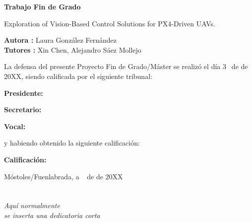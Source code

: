 \documentclass[a4paper, 12pt]{book}
\begin{document}
\vspace{-4cm}
\begin{center}
\LARGE
\textbf{Trabajo Fin de Grado}

\vspace{1cm}
\large
Exploration of Vision-Based Control Solutions for PX4-Driven UAVs.

\vspace{1cm}
\large
\textbf{Autora :} Laura González Fernández \\
\textbf{Tutores :} Xin Chen, Alejandro Sáez Mollejo

\end{center}

\vspace{1cm}
La defensa del presente Proyecto Fin de Grado/Máster se realizó el día 3\qquad$\;\,$ de
\qquad\qquad\qquad\qquad \newline de 20XX, siendo calificada por el siguiente tribunal:


\vspace{0.5cm}
\textbf{Presidente:}

\vspace{0.8cm}
\textbf{Secretario:}

\vspace{0.8cm}
\textbf{Vocal:}


\vspace{0.8cm}
y habiendo obtenido la siguiente calificación:

\vspace{0.8cm}
\textbf{Calificación:}


\vspace{0.8cm}
\begin{flushright}
Móstoles/Fuenlabrada, a \qquad$\;\,$ de \qquad\qquad\qquad\qquad de 20XX
\end{flushright}


\chapter*{}
\begin{flushright}
\textit{Aquí normalmente \\
se inserta una dedicatoria corta \\}
\end{flushright}

\end{document}
